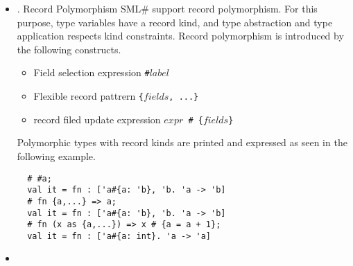 \documentclass{jbook}
\newif\ifjp
\newcommand{\smlsharp}{SML\#}
\begin{document}
\begin{itemize}
\item 
\ifjp%
	レコード多相性．
	\smlsharp{}はレコード多相性をサポートしている．
	このために型変数は，レコードカインドを持ち，型抽象と型適用はカイ
ンド条件を満たすように制限される．
	レコード多相性は，以下の式で導入される．
\begin{itemize}
\item フィールド選択式 {\tt \#$label$}
\item フレキシブルレコードパターン {\tt \{$fields$, ...\}}
\item フィールドの変更式 {\tt $expr$ \# \{$fields$\}}
\end{itemize}
	レコードカインドを持つ多相型は以下の例のように表示される．
\begin{verbatim}
  # #a;
  val it = fn : ['a#{a: 'b}, 'b. 'a -> 'b]
  # fn {a,...} => a;
  val it = fn : ['a#{a: 'b}, 'b. 'a -> 'b]
  # fn (x as {a,...}) => x # {a = a + 1};
  val it = fn : ['a#{a: int}. 'a -> 'a]
\end{verbatim}
\else%
.	Record Polymorphism
	\smlsharp{} support record polymorphism.
	For this purpose, type variables have a record kind, and type
abstraction and type application respects kind constraints.
	Record polymorphism is introduced by the following constructs.
\begin{itemize}
\item Field selection expression {\tt \#$label$}
\item Flexible record pattrern {\tt \{$fields$, ...\}}
\item record filed update expression {\tt $expr$ \# \{$fields$\}}
\end{itemize}
	Polymorphic types with record kinds are printed and expressed as
seen in the following example.
\begin{verbatim}
  # #a;
  val it = fn : ['a#{a: 'b}, 'b. 'a -> 'b]
  # fn {a,...} => a;
  val it = fn : ['a#{a: 'b}, 'b. 'a -> 'b]
  # fn (x as {a,...}) => x # {a = a + 1};
  val it = fn : ['a#{a: int}. 'a -> 'a]
\end{verbatim}
\fi%

\item 


\end{itemize}
\end{document}
